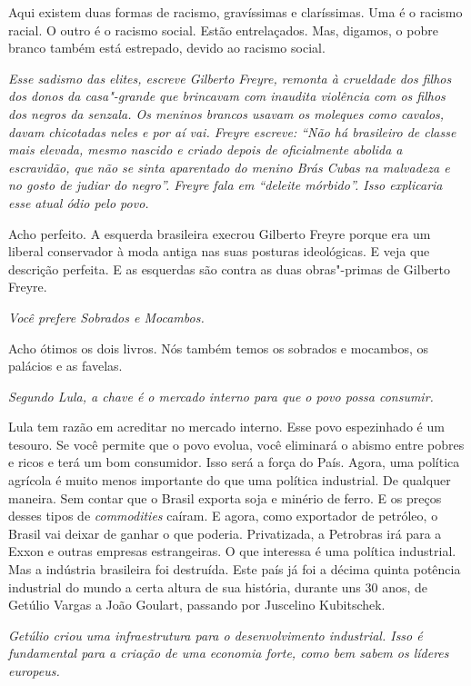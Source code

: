 \normalfont
Aqui existem duas formas de racismo, gravíssimas e
claríssimas. Uma é o racismo racial. O outro é o racismo social. Estão
entrelaçados. Mas, digamos, o pobre branco também está estrepado, devido
ao racismo social.

\itshape
 Esse sadismo das elites, escreve Gilberto Freyre,
remonta à crueldade dos filhos dos donos da casa"-grande que brincavam
com inaudita violência com os filhos dos negros da senzala. Os meninos
brancos usavam os moleques como cavalos, davam chicotadas neles e por aí
vai. Freyre escreve: ``Não há brasileiro de classe mais elevada, mesmo
nascido e criado depois de oficialmente abolida a escravidão, que não se
sinta aparentado do menino Brás Cubas na malvadeza e no gosto de judiar
do negro''. Freyre fala em ``deleite mórbido''. Isso explicaria esse
atual ódio pelo povo.

\normalfont
Acho perfeito. A esquerda brasileira execrou Gilberto
Freyre porque era um liberal conservador à moda antiga nas suas posturas
ideológicas. E veja que descrição perfeita. E as esquerdas são contra as
duas obras"-primas de Gilberto Freyre.

\itshape
 Você prefere \emph{Sobrados e Mocambos}.

\normalfont
Acho ótimos os dois livros. Nós também temos os sobrados
e mocambos, os palácios e as favelas.

\itshape
 Segundo Lula, a chave é o mercado interno para que o
povo possa consumir.

\normalfont
Lula tem razão em acreditar no mercado interno. Esse povo
espezinhado é um tesouro. Se você permite que o povo evolua, você
eliminará o abismo entre pobres e ricos e terá um bom consumidor. Isso
será a força do País. Agora, uma política agrícola é muito menos
importante do que uma política industrial. De qualquer maneira. Sem
contar que o Brasil exporta soja e minério de ferro. E os preços desses
tipos de \emph{commodities} caíram. E agora, como exportador de
petróleo, o Brasil vai deixar de ganhar o que poderia. Privatizada, a
Petrobras irá para a Exxon e outras empresas estrangeiras. O que
interessa é uma política industrial. Mas a indústria brasileira foi
destruída. Este país já foi a décima quinta potência industrial do mundo
a certa altura de sua história, durante uns 30 anos, de Getúlio Vargas a
João Goulart, passando por Juscelino Kubitschek.

\itshape
 Getúlio criou uma infraestrutura para o desenvolvimento
industrial. Isso é fundamental para a criação de uma economia forte,
como bem sabem os líderes europeus.

